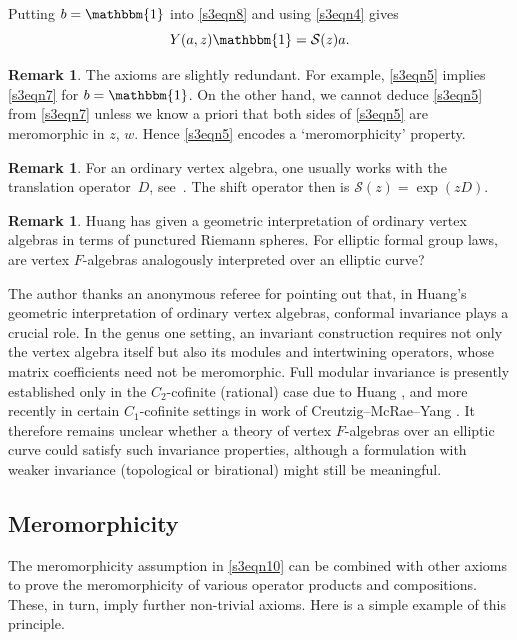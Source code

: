 \documentclass[pdftex]{sigma}
\numberwithin{equation}{section}
\theoremstyle{definition}
\newtheorem{Remark}[Theorem]{Remark}
\begin{document}
Putting $b=\mathbbm{1}$ into \eqref{s3eqn8} and using \eqref{s3eqn4} gives
\begin{equation}
\label{s3YD}
 Y(a,z)\mathbbm{1}=\mathcal{S}(z)a.
\end{equation}

\begin{Remark}
The axioms are slightly redundant. For example, \eqref{s3eqn5} implies \eqref{s3eqn7} for $b=\mathbbm{1}$. On the other hand, we cannot deduce \eqref{s3eqn5} from \eqref{s3eqn7} unless we know a priori that both sides of \eqref{s3eqn5} are meromorphic in $z$, $w$. Hence \eqref{s3eqn5} encodes a `meromorphicity' property.
\end{Remark}

\begin{Remark}
For an ordinary vertex algebra, one usually works with the translation operator~$D$, see~\cite{LL}. The shift operator then is $\mathcal{S}(z)=\exp(zD)$.
\end{Remark}

\begin{Remark}\label{ConjecturalRemark}
Huang \cite{Huang} has given a geometric interpretation of ordinary vertex algebras in terms of punctured Riemann spheres. For elliptic formal group laws, are vertex $F$-algebras analogously interpreted over an elliptic curve?

The author thanks an anonymous referee for pointing out that, in Huang's geometric interpretation of ordinary vertex algebras, conformal invariance plays a crucial role. In the genus one setting, an invariant construction requires not only the vertex algebra itself but also its modules and intertwining operators, whose matrix coefficients need not be meromorphic. Full modular invariance is presently established only in the $C_2$-cofinite (rational) case due to Huang \cite{HuangModular}, and more recently in certain $C_1$-cofinite settings in work of Creutzig--McRae--Yang \cite{CMY}. It therefore remains unclear whether a theory of vertex $F$-algebras over an elliptic curve could satisfy such invariance properties, although a formulation with weaker invariance (topological or birational) might still be meaningful.
\end{Remark}

\subsection{Meromorphicity}
\label{s42}

The meromorphicity assumption in \eqref{s3eqn10} can be combined with other axioms to prove the meromorphicity of various operator products and compositions. These, in turn, imply further non-trivial axioms. Here is a simple example of this principle.
\end{document}
